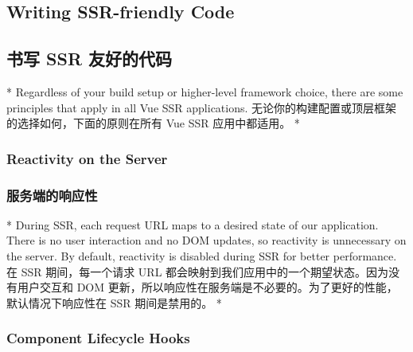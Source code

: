 \begin{paracol}{2}
\subsection{Writing SSR-friendly Code}
\switchcolumn
\subsection{书写 SSR 友好的代码}
\switchcolumn[0]*%
Regardless of your build setup or higher-level framework choice, there
are some principles that apply in all Vue SSR applications.
\switchcolumn
无论你的构建配置或顶层框架的选择如何，下面的原则在所有 Vue SSR
应用中都适用。
\switchcolumn[0]*%
\subsubsection{Reactivity on the Server}
\switchcolumn
\subsubsection{服务端的响应性}
\switchcolumn[0]*%
During SSR, each request URL maps to a desired state of our application.
There is no user interaction and no DOM updates, so reactivity is
unnecessary on the server. By default, reactivity is disabled during SSR
for better performance.
\switchcolumn
在 SSR 期间，每一个请求 URL
都会映射到我们应用中的一个期望状态。因为没有用户交互和 DOM
更新，所以响应性在服务端是不必要的。为了更好的性能，默认情况下响应性在
SSR 期间是禁用的。
\switchcolumn[0]*%
\subsubsection{Component Lifecycle Hooks}
\switchcolumn

\end{paracol}
